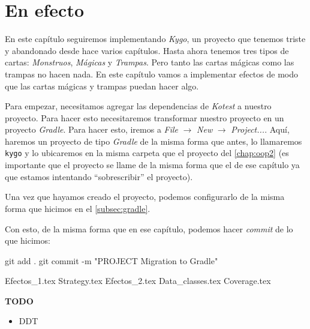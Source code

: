 \chapter{En efecto}
\label{sec:strategy}
  
  En este capítulo seguiremos implementando \textit{Kygo}, un proyecto que tenemos triste y
  abandonado desde hace varios capítulos.
  Hasta ahora tenemos tres tipos de cartas: \textit{Monstruos}, \textit{Mágicas} y \textit{Trampas}.
  Pero tanto las cartas mágicas como las trampas no hacen nada.
  En este capítulo vamos a implementar efectos de modo que las cartas mágicas y trampas puedan
  hacer algo.

  Para empezar, necesitamos agregar las dependencias de \textit{Kotest} a nuestro proyecto.
  Para hacer esto necesitaremos transformar nuestro proyecto en un proyecto \textit{Gradle}.
  Para hacer esto, iremos a \textit{File} $\rightarrow$ \textit{New} $\rightarrow$ 
  \textit{Project...}.
  Aquí, haremos un proyecto de tipo \textit{Gradle} de la misma forma que antes, lo llamaremos
  \texttt{kygo} y lo ubicaremos en la misma carpeta que el proyecto del \cref{chap:oop2} (es 
  importante que el proyecto se llame de la misma forma que el de ese capítulo ya que estamos 
  intentando \enquote{sobrescribir} el proyecto).

  Una vez que hayamos creado el proyecto, podemos configurarlo de la misma forma que hicimos en el
  \cref{subsec:gradle}.

  Con esto, de la misma forma que en ese capítulo, podemos hacer \textit{commit} de lo que hicimos:

  \begin{powershell}
    git add .
    git commit -m "PROJECT Migration to Gradle"
  \end{powershell}

  {Efectos_1.tex}
  {Strategy.tex}
  {Efectos_2.tex}
  {Data_classes.tex}
  {Coverage.tex}
  
  \textbf{TODO}
  \begin{itemize}
    \item DDT
  \end{itemize}

  \printbibliography[keyword=strategy]